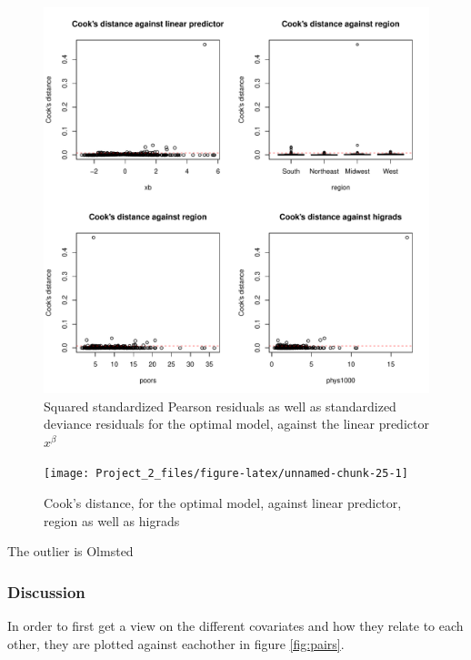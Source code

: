 \documentclass[a4paper]{article}
\begin{document}
\begin{figure}[h]
\includegraphics{Project_2_files/figure-latex/unnamed-chunk-24-1} \caption{\label{fig:residuals_optimal}Squared standardized Pearson residuals as well as standardized deviance residuals for the optimal model, against the linear predictor $x^{\beta}$}\label{fig:unnamed-chunk-24}
\end{figure}

\begin{figure}[h]
\texttt{[image: Project\_2\_files/figure-latex/unnamed-chunk-25-1]} \caption{\label{fig:cooks_optimal}Cook's distance, for the optimal model, against linear predictor, region as well as higrads}\label{fig:unnamed-chunk-25}
\end{figure}

The outlier is Olmsted

\hypertarget{discussion}{%
\subsubsection{Discussion}\label{discussion}}

In order to first get a view on the different covariates and how they
relate to each other, they are plotted against eachother in figure
\ref{fig:pairs}.
\end{document}
